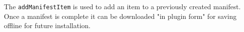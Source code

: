 The \verb+addManifestItem+ is used to add an item to a previously created manifest. Once a manifest is complete it can
be downloaded "in plugin form" for saving offline for future installation.
